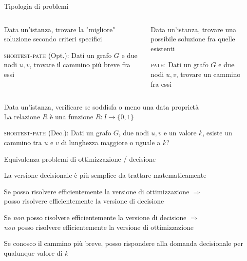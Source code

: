\begin{frame}{Tipologia di problemi}

\small
\vspace{-15pt}
\begin{columns}[T]
\begin{myboxtitle}
\BI
\item Data un'istanza, trovare la "migliore" soluzione secondo criteri specifici
\item \alert{\textsc{shortest-path} (Opt.)}:
Dati un grafo $G$ e due nodi $u, v$,
trovare il cammino più breve fra essi
\EI
\end{myboxtitle}
\begin{myboxtitle}
\BI
\item Data un'istanza, trovare una possibile soluzione fra quelle esistenti
\item \alert{\textsc{path}}: Dati un grafo $G$ e due nodi $u, v$, trovare un
cammino fra essi
\EI
\end{myboxtitle}
\end{columns}

\begin{myboxtitle}
\BI
\item Data un'istanza, verificare se soddisfa o meno una data proprietà\\
La relazione $R$ è una funzione $R: I \rightarrow \{ 0, 1 \}$ 
\item \alert{\textsc{shortest-path} (Dec.)}: Dati un grafo $G$, due nodi $u,v$  e un valore $k$, esiste un cammino tra $u$ e $v$ di lunghezza maggiore o uguale a $k$?
\EI
\end{myboxtitle}


\end{frame}

\begin{frame}{Equivalenza problemi di ottimizzazione / decisione}

\BIL
\item La versione decisionale è più semplice da trattare matematicamente
\item Se posso risolvere efficientemente la versione di ottimizzazione
$\Rightarrow$ \\ posso risolvere efficientemente la versione di decisione 
\item \alert{Se \emph{non} posso risolvere efficientemente la versione di decisione
$\Rightarrow$ \\ \emph{non} posso risolvere efficientemente la versione di ottimizzazione}
\EIL

\begin{myboxtitle}
\BIL
\item Se conosco il cammino più breve, posso rispondere alla domanda decisionale
per qualunque valore di $k$
\EIL
\end{myboxtitle}


\end{frame}


